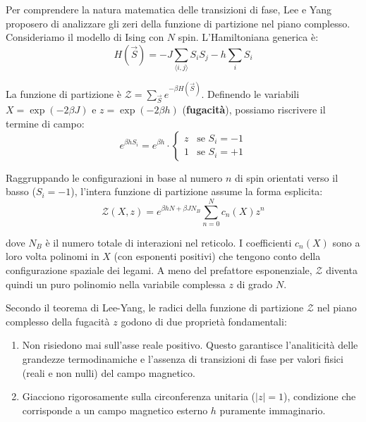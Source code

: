Per comprendere la natura matematica delle transizioni di fase, Lee e Yang proposero di analizzare gli zeri della funzione di partizione nel piano complesso.
Consideriamo il modello di Ising con $N$ spin. L'Hamiltoniana generica è:
\begin{equation}
H(\vec{S}) = - J \sum_{\langle i,j \rangle} S_i S_j - h \sum_i S_i
\end{equation}

\noindent La funzione di partizione è $\mathcal{Z} = \sum_{\vec{S}} e^{-\beta H(\vec{S})}$.
Definendo le variabili $X = \exp(-2\beta J)$ e $z = \exp(-2\beta h)$ (\textbf{fugacità}), possiamo riscrivere il termine di campo:
\begin{equation}
e^{\beta h S_i} = e^{\beta h} \cdot \begin{cases} z & \text{se } S_i = -1 \\ 1 & \text{se } S_i = +1 \end{cases}
\end{equation}

\noindent Raggruppando le configurazioni in base al numero $n$ di spin orientati verso il basso ($S_i = -1$), l'intera funzione di partizione assume la forma esplicita:
\begin{equation}
\mathcal{Z}(X, z) = e^{\beta h N + \beta J N_B} \sum_{n=0}^N c_n(X) z^n
\end{equation}

\noindent dove $N_B$ è il numero totale di interazioni nel reticolo. I coefficienti $c_n(X)$ sono a loro volta polinomi in $X$ (con esponenti positivi) che tengono conto della configurazione spaziale dei legami. A meno del prefattore esponenziale, $\mathcal{Z}$ diventa quindi un puro polinomio nella variabile complessa $z$ di grado $N$.

\hfill 

\noindent Secondo il teorema di Lee-Yang, le radici della funzione di partizione $\mathcal{Z}$ nel piano complesso della fugacità $z$ godono di due proprietà fondamentali:
\begin{enumerate}
\item Non risiedono mai sull'asse reale positivo. Questo garantisce l'analiticità delle grandezze termodinamiche e l'assenza di transizioni di fase per valori fisici (reali e non nulli) del campo magnetico.
\item Giacciono rigorosamente sulla circonferenza unitaria ($|z|=1$), condizione che corrisponde a un campo magnetico esterno $h$ puramente immaginario.
\end{enumerate}


